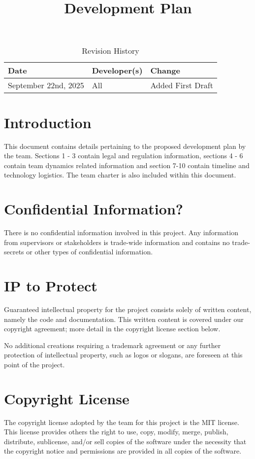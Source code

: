 \documentclass{article}
\title{Development Plan\\\progname}
\author{\authname}
\date{}
\begin{document}
\maketitle

\begin{table}[hp]
\caption{Revision History} \label{TblRevisionHistory}
\begin{tabularx}{\textwidth}{llX}
\toprule
\textbf{Date} & \textbf{Developer(s)} & \textbf{Change}\\
\midrule
September 22nd, 2025 & All & Added First Draft \\
\bottomrule
\end{tabularx}
\end{table}

\newpage{}

\section{Introduction}
This document contains details pertaining to the proposed development plan by the team.
Sections 1 - 3 contain legal and regulation information, sections 4 - 6 contain team dynamics related information and 
section 7-10 contain timeline and technology logistics. The team charter is also included within this document. \\


\section{Confidential Information?}
There is no confidential information involved in this project. Any information
from supervisors or stakeholders is trade-wide information and contains
no trade-secrets or other types of confidential information.

\section{IP to Protect}
Guaranteed intellectual property for the project consists solely of written
content, namely the code and documentation. This written content is covered
under our copyright agreement; more detail in the copyright license section
below.

No additional creations requiring a trademark agreement or any further
protection of intellectual property, such as logos or slogans, are foreseen
at this point of the project.

\section{Copyright License}
The copyright license adopted by the team for this project is the MIT license.
This license provides others the right to use, copy, modify, merge, publish,
distribute, sublicense, and/or sell copies of the software under the necessity
that the copyright notice and permissions are provided in all copies of the software.
\end{document}
